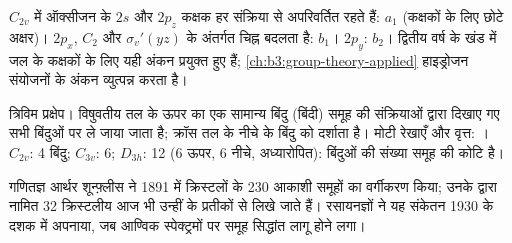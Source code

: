 \begin{example}[जल में ऑक्सीजन के कक्षक]\label{ex:b3:point-groups:water-orbitals}
$C_{2v}$ में ऑक्सीजन के $2s$ और $2p_z$ कक्षक हर
संक्रिया से अपरिवर्तित रहते हैं: $a_1$ (कक्षकों के लिए छोटे अक्षर)। $2p_x$, $C_2$ और
$\sigma_v'(yz)$ के अंतर्गत चिह्न बदलता है: $b_1$। $2p_y$: $b_2$। द्वितीय वर्ष के खंड में
जल के कक्षकों के लिए यही अंकन प्रयुक्त हुए हैं; \cref{ch:b3:group-theory-applied}
हाइड्रोजन संयोजनों के अंकन व्युत्पन्न करता है।
\end{example}

\begin{omfigure}

{\small त्रिविम प्रक्षेप। विषुवतीय तल के ऊपर का एक सामान्य बिंदु
(बिंदी) समूह की संक्रियाओं द्वारा दिखाए गए सभी बिंदुओं पर ले जाया जाता है;
क्रॉस तल के नीचे के बिंदु को दर्शाता है। मोटी रेखाएँ और वृत्त:
। $C_{2v}$: 4 बिंदु; $C_{3v}$: 6; $D_{3h}$: 12 (6 ऊपर, 6
नीचे, अध्यारोपित): बिंदुओं की संख्या समूह की कोटि है।}
\end{omfigure}

\begin{history}[शून्फ़्लीस और क्रिस्टलों की सममिति]
गणितज्ञ आर्थर शून्फ़्लीस ने 1891 में क्रिस्टलों के 230 आकाशी
समूहों का वर्गीकरण किया; उनके द्वारा नामित 32 क्रिस्टलीय  आज भी
उन्हीं के प्रतीकों से लिखे जाते हैं। रसायनज्ञों ने यह संकेतन 1930 के दशक में अपनाया,
जब आण्विक स्पेक्ट्रमों पर समूह सिद्धांत लागू होने लगा।
\end{history}

